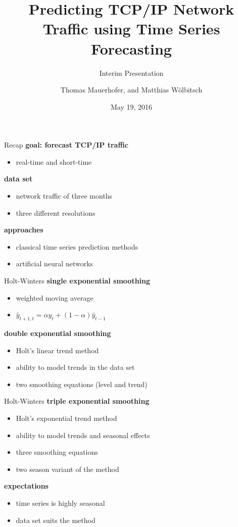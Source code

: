 \documentclass{beamer}
\title{Predicting TCP/IP Network Traffic using Time Series Forecasting}
\subtitle{Interim Presentation}
\date{May 19, 2016}
\author{Thomas Mauerhofer, and Matthias Wölbitsch}
\begin{document}
  \maketitle
  
  \begin{frame}{Recap}   
    \textbf{goal: forecast TCP/IP traffic}
    \begin{itemize}
     \item real-time and short-time
    \end{itemize}
    
    \textbf{data set}
    \begin{itemize}
     \item network traffic of three months
     \item three different resolutions
    \end{itemize}
    
    \textbf{approaches}
    \begin{itemize}
     \item classical time series prediction methods
     \item artificial neural networks
    \end{itemize}
  \end{frame}
 
 
  \begin{frame}{Holt-Winters}
  \textbf{single exponential smoothing}
  \begin{itemize}
   \item weighted moving average
   \item \( \hat{y}_{t+1,t} = \alpha y_t + (1 - \alpha) \hat{y}_{t-1}\)
  \end{itemize}
  
  \textbf{double exponential smoothing}
  \begin{itemize}
   \item Holt's linear trend method
   \item ability to model trends in the data set
   \item two smoothing equations (level and trend)
  \end{itemize}
  \end{frame}
  
  \begin{frame}{Holt-Winters}
  \textbf{triple exponential smoothing}
  \begin{itemize}
   \item Holt's exponential trend method
   \item ability to model trends and seasonal effects
   \item three smoothing equations
   \item two season variant of the method
  \end{itemize}
  
  \textbf{expectations}
  \begin{itemize}
   \item time series is highly seasonal
   \item data set suits the method
  \end{itemize}
  \end{frame}
\end{document}
